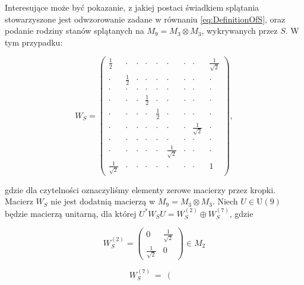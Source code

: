 {Interesujące może być pokazanie, z jakiej postaci świadkiem splątania
stowarzyszone jest odwzorowanie zadane w równaniu \eqref{eq:DefinitionOfS},
oraz podanie rodziny stanów splątanych na
$M_{9} = M_{3} \! \otimes \! M_{3}$, wykrywanych przez $S$.
W tym przypadku:
\begin{linenomath*}
 \begin{equation}
\label{WS-C}
 W_S =  \left( \begin{array}{ccc|ccc|ccc}
 \frac{1}{2} &  \cdot& \cdot& \cdot& \cdot& \cdot& \cdot& \cdot& \frac{1}{\sqrt{2}} \\
 \cdot& \frac{1}{2} &\cdot& \cdot& \cdot& \cdot& \cdot& \cdot& \cdot\\
 \cdot& \cdot& \cdot & \cdot& \cdot& \cdot& \cdot& \cdot& \cdot  \\ \hline
 \cdot& \cdot& \cdot& \frac{1}{2} & \cdot& \cdot& \cdot& \cdot&  \cdot \\
 \cdot& \cdot& \cdot& \cdot& \frac{1}{2} & \cdot& \cdot& \cdot&  \cdot \\
 \cdot& \cdot& \cdot& \cdot& \cdot& \cdot& \cdot & \frac{1}{\sqrt{2}}& \cdot  \\ \hline
 \cdot& \cdot& \cdot & \cdot& \cdot& \cdot& \cdot& \cdot& \cdot  \\
 \cdot & \cdot& \cdot& \cdot& \cdot& \frac{1}{\sqrt{2}}& \cdot& \cdot& \cdot \\
 \frac{1}{\sqrt{2}}& \cdot& \cdot& \cdot& \cdot & \cdot& \cdot& \cdot& 1
  \end{array} \right),
 \end{equation}
\end{linenomath*}
gdzie dla czytelności oznaczyliśmy elementy zerowe macierzy przez kropki.
Macierz $W_{S}$ nie jest dodatnią macierzą w
$M_{9} = M_{3} \! \otimes \! M_{3}$.
Niech $U \in \text{U}(9)$ będzie macierzą unitarną, dla której
$U^{*} W_{S} U = W_{S}^{(2)} \oplus W_{S}^{(7)}$,
gdzie
\begin{linenomath*}
\begin{equation}
\label{WS-DirectSum}
 W_{S}^{(2)} = \left(\begin{array}{cc}
    0 & \frac{1}{\sqrt{2}}  \\ \frac{1}{\sqrt{2}}  & 0
  \end{array}\right) \in M_{2}
 \end{equation}
\end{linenomath*}
\begin{linenomath*}
\begin{equation}
 W_S^{(7)}\ = \  \left( \begin{array}{ccccccc}

\end{array}
\end{equation}
\end{linenomath*}}

